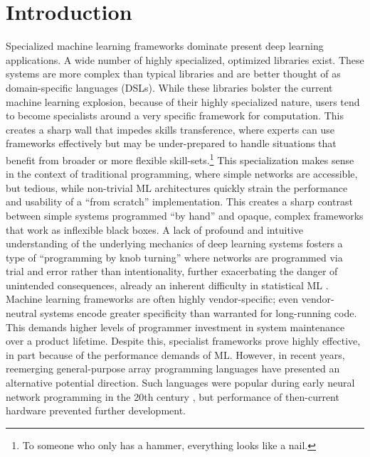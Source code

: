 \documentclass[10pt,twocolumn,english,format=sigplan,screen,balance]{acmart}
\begin{document}
\section{Introduction}

Specialized machine learning frameworks dominate present deep learning
applications. A wide number of highly specialized, optimized libraries
exist. These systems are more complex than typical libraries and are
better thought of as domain-specific languages (DSLs). While these
libraries bolster the current machine learning explosion, because
of their highly specialized nature, users tend to become specialists
around a very specific framework for computation. This creates a sharp
wall that impedes skills transference, where experts can use frameworks
effectively but may be under-prepared to handle situations that benefit
from broader or more flexible skill-sets.\footnote{To someone who only has a hammer, everything looks like a nail.}
This specialization makes sense in the context of traditional programming,
where simple networks are accessible, but tedious, while non-trivial
ML architectures quickly strain the performance and usability of a
“from scratch” implementation. This creates a sharp contrast
between simple systems programmed “by hand” and opaque, complex
frameworks that work as inflexible black boxes. A lack of profound
and intuitive understanding of the underlying mechanics of deep learning
systems fosters a type of “programming by knob turning” where
networks are programmed via trial and error rather than intentionality,
further exacerbating the danger of unintended consequences, already
an inherent difficulty in statistical ML \citep{domingos2012few}.
Machine learning frameworks are often highly vendor-specific; even
vendor-neutral systems encode greater specificity than warranted for
long-running code. This demands higher levels of programmer investment
in system maintenance over a product lifetime. Despite this, specialist
frameworks prove highly effective, in part because of the performance
demands of ML. However, in recent years, reemerging general-purpose
array programming languages have presented an alternative potential
direction. Such languages were popular during early neural network
programming in the 20th century \citep{alfonseca-1990-aplnn}, but
performance of then-current hardware prevented further development.
\end{document}
